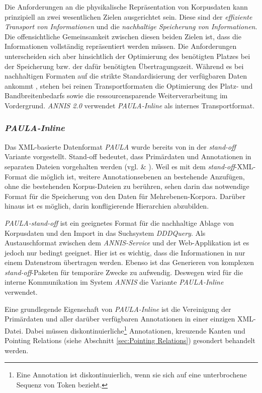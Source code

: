 Die Anforderungen an die physikalische Repräsentation von Korpusdaten kann prinzipiell an zwei wesentlichen Zielen ausgerichtet sein. Diese sind der \emph{effiziente Transport von Informationen} und die \emph{nachhaltige Speicherung von Informationen}. Die offensichtliche Gemeinsamkeit zwischen diesen beiden Zielen ist, dass die Informationen vollständig repräsentiert werden müssen. Die Anforderungen unterscheiden sich aber hinsichtlich der Optimierung des benötigten Platzes bei der Speicherung bzw. der dafür benötigten Übertragungszeit. Während es bei nachhaltigen Formaten auf die strikte Standardisierung der verfügbaren Daten ankommt \citep[][]{lehmbergXXXXstandards}, stehen bei reinen Transportformaten die Optimierung des Platz- und Bandbreitenbedarfs sowie die ressourcensparende Weiterverarbeitung im Vordergrund. \emph{ANNIS 2.0} verwendet \emph{PAULA-Inline} als internes Transportformat. 

\subsubsection{\emph{PAULA-Inline}}\label{sec:Korpussuche.Datenformat.PAULA-Inline}

 Das XML-basierte Datenformat \emph{PAULA} wurde bereits von \cite{dipper2005paula} in der \emph{stand-off} Variante vorgestellt. Stand-off bedeutet, dass Primärdaten und Annotationen in separaten Dateien vorgehalten werden (vgl. \citet[][]{thompson1997standoff} \& \citet[][]{carletta2005nite}). Weil es mit dem \emph{stand-off}-XML-Format die möglich ist, weitere Annotationsebenen an bestehende Anzufügen, ohne die bestehenden Korpus-Dateien zu berühren, sehen \cite{sperberg1994teip3} darin das notwendige Format für die Speicherung von den Daten für Mehrebenen-Korpora. Darüber hinaus ist es möglich, darin konfligierende Hierarchien abzubilden.

\emph{PAULA-stand-off} ist ein geeignetes Format für die nachhaltige Ablage von Korpusdaten und den Import in das Suchsystem \emph{DDDQuery}. Als Austauschformat zwischen dem \emph{ANNIS-Service} und der Web-Applikation ist es jedoch nur bedingt geeignet. Hier ist es wichtig, dass die Informationen in nur einem Datenstrom übertragen werden. Ebenso ist das Generieren von komplexen \emph{stand-off}-Paketen für temporäre Zwecke zu aufwendig. Deswegen wird für die interne Kommunikation im System \emph{ANNIS} die Variante \emph{PAULA-Inline} verwendet.

Eine grundlegende Eigenschaft von \emph{PAULA-Inline} ist die Vereinigung der Primärdaten und aller darüber verfügbaren Annotationen in einer einzigen XML-Datei. Dabei müssen diskontinuierliche\footnote{Eine Annotation ist diskontinuierlich, wenn sie sich auf eine unterbrochene Sequenz von Token bezieht.} Annotationen, kreuzende Kanten und Pointing Relations (siehe Abschnitt \ref{sec:Pointing Relations}) gesondert behandelt werden.

